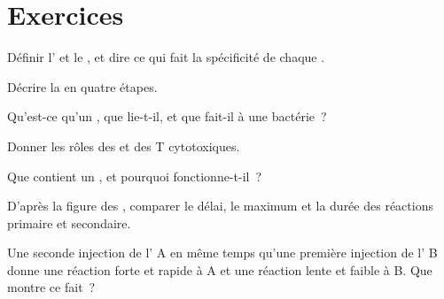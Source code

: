 \section{Exercices}

\begin{exercise}[$\star$]\label{exo:g12:adaptive-immunity:1}
Définir l' et le , et dire ce qui fait la
spécificité de chaque .
\end{exercise}

\begin{exercise}[$\star$]\label{exo:g12:adaptive-immunity:2}
Décrire la  en quatre étapes.
\end{exercise}

\begin{exercise}[$\star$]\label{exo:g12:adaptive-immunity:3}
Qu'est-ce qu'un , que lie-t-il, et que fait-il à une
bactérie~?
\end{exercise}

\begin{exercise}[$\star$]\label{exo:g12:adaptive-immunity:4}
Donner les rôles des  et des  T
cytotoxiques.
\end{exercise}

\begin{exercise}[$\star$]\label{exo:g12:adaptive-immunity:5}
Que contient un , et pourquoi fonctionne-t-il~?
\end{exercise}

\begin{exercise}[$\star\star$]\label{exo:g12:adaptive-immunity:6}
D'après la figure des , comparer le délai, le maximum et la
durée des réactions primaire et secondaire.
\end{exercise}

\begin{exercise}[$\star\star$]\label{exo:g12:adaptive-immunity:7}
Une seconde injection de l' A en même temps qu'une première
injection de l' B donne une réaction forte et rapide à A et
une réaction lente et faible à B. Que montre ce fait~?
\end{exercise}

